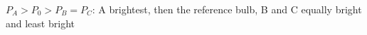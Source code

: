 $P_A > P_0 > P_B = P_C$: A brightest, then the reference bulb, B and C equally bright and least bright
